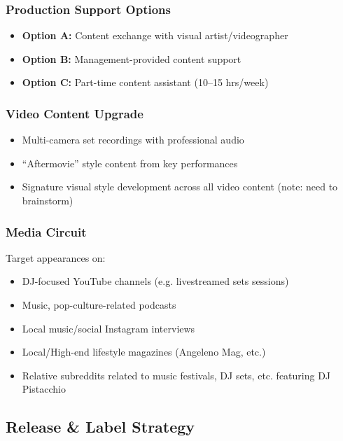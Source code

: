 \documentclass[11pt,a4paper]{article}
\begin{document}
\subsubsection{Production Support Options}
\begin{itemize}[leftmargin=*]
    \item \textbf{Option A:} Content exchange with visual artist/videographer
    \item \textbf{Option B:} Management-provided content support
    \item \textbf{Option C:} Part-time content assistant (10--15 hrs/week)
\end{itemize}

\subsubsection{Video Content Upgrade}
\begin{itemize}[leftmargin=*]
    \item Multi-camera set recordings with professional audio
    \item ``Aftermovie'' style content from key performances
    \item Signature visual style development across all video content (note: need to brainstorm)
\end{itemize}

\subsubsection{Media Circuit}
Target appearances on:
\begin{itemize}[leftmargin=*]
    \item DJ-focused YouTube channels (e.g. livestreamed sets sessions)
    \item Music, pop-culture-related podcasts
    \item Local music/social Instagram interviews
    \item Local/High-end lifestyle magazines (Angeleno Mag, etc.)
    \item Relative subreddits related to music festivals, DJ sets, etc. featuring DJ Pistacchio  
\end{itemize}

\subsection{Release \& Label Strategy}
\end{document}

